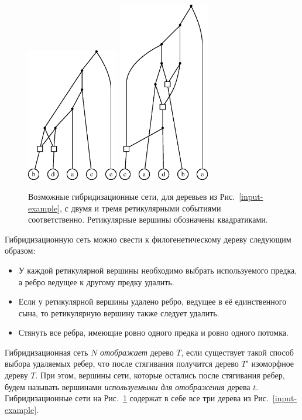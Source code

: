 \begin{figure}[t]
  \centering
  \includegraphics[width=4cm]{img/ans.eps}
  \hspace{1cm}
  \includegraphics[width=4cm]{img/ans3.eps}
  \caption{Возможные гибридизационные сети, для деревьев из Рис.~\ref{input-example}, с двумя и тремя ретикулярными событиями соответственно. Ретикулярные вершины обозначены квадратиками.}
  \label{network-example}
\end{figure}

Гибридизационную сеть можно свести к филогенетическому дереву следующим образом:

\begin{itemize}
	\item У каждой ретикулярной вершины необходимо выбрать используемого предка, а ребро ведущее к другому предку удалить.
	\item Если у ретикулярной вершины удалено ребро, ведущее в её единственного сына, то ретикулярную вершину также следует удалить.
	\item Стянуть все ребра, имеющие ровно одного предка и ровно одного потомка.
\end{itemize}

Гибридизационная сеть $N$ \emph{отображает} дерево $T$, если существует такой способ выбора удаляемых ребер, что после стягивания получится дерево $T'$ изоморфное дереву $T$.
При этом, вершины сети, которые остались после стягивания ребер, будем называть вершинами \emph{используемыми для отображения} дерева $t$.
Гибридизационные сети на Рис.~\ref{network-example} содержат в себе все три дерева из Рис.~\ref{input-example}.

